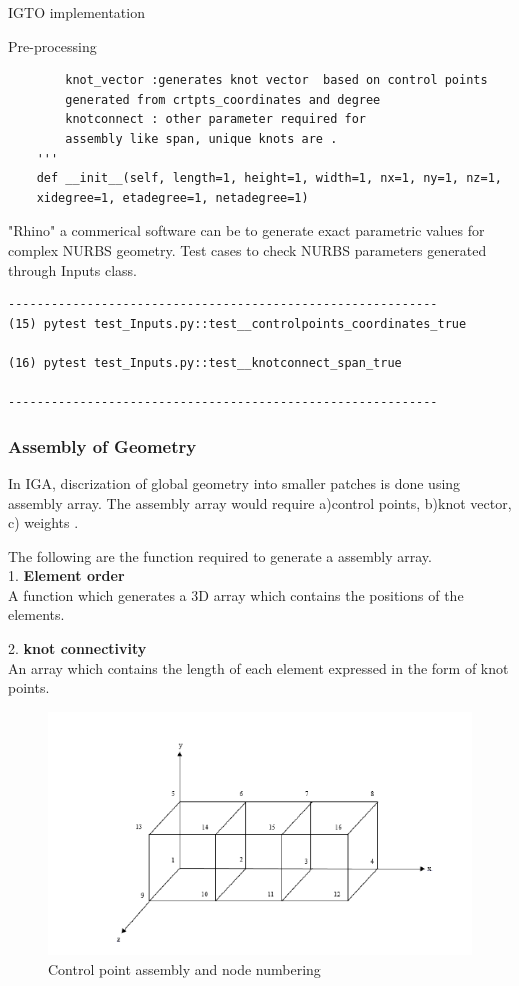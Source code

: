 \documentclass[a4paper,12pt,times]{article}
\begin{document}
\begin{section}{IGTO implementation}
\begin{subsection}{Pre-processing}
\begin{lstlisting}
        knot_vector :generates knot vector  based on control points 
        generated from crtpts_coordinates and degree
        knotconnect : other parameter required for 
        assembly like span, unique knots are .
    '''
    def __init__(self, length=1, height=1, width=1, nx=1, ny=1, nz=1, 
    xidegree=1, etadegree=1, netadegree=1)
\end{lstlisting}
 "Rhino" a commerical software can be to generate exact parametric values for complex NURBS geometry.
Test cases to check NURBS parameters generated through Inputs class.
\begin{verbatim}
------------------------------------------------------------
(15) pytest test_Inputs.py::test__controlpoints_coordinates_true

(16) pytest test_Inputs.py::test__knotconnect_span_true

------------------------------------------------------------
\end{verbatim}

\subsubsection{Assembly of Geometry}
In IGA, discrization of global geometry into smaller patches is done using assembly array. The assembly array would require a)control points, b)knot vector, c) weights .

The following are the function required to generate a assembly array.\\

1.\textbf{ Element order}\\
A function which generates a 3D array which contains the positions of the elements.


2.\textbf{ knot connectivity}\\
An array which contains the length of each element expressed in the form of knot points.

\begin{figure}[h!]
\centering
\includegraphics[width=\linewidth]{element numbering.png}
\caption{Control point assembly and node numbering}
\label{fig:Control point assembly and node numbering}
\end{figure}


\end{subsection}
\end{section}
\end{document}
